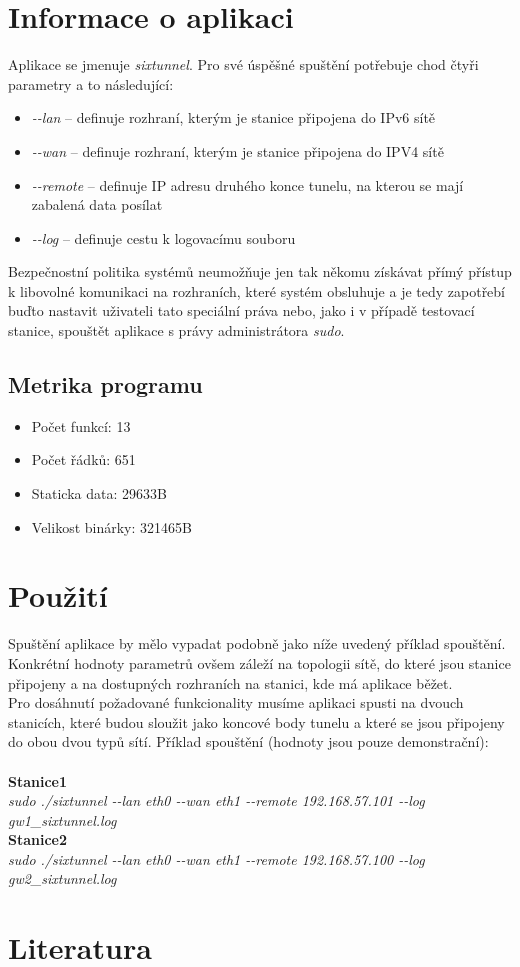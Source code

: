 \documentclass[12pt,a4paper,onecolumn]{article}
\begin{document}
\section{Informace o aplikaci}
Aplikace se jmenuje {\it sixtunnel}. Pro své úspěšné spuštění potřebuje chod čtyři parametry a
to následující:
\begin{itemize}
    \item {\it \--\--lan} -- definuje rozhraní, kterým je stanice připojena do IPv6 sítě
    \item {\it \--\--wan} -- definuje rozhraní, kterým je stanice připojena do IPV4 sítě
    \item {\it \--\--remote} -- definuje IP adresu druhého konce tunelu, na kterou se mají
        zabalená data posílat
    \item {\it \--\--log} -- definuje cestu k logovacímu souboru
\end{itemize}
\indent Bezpečnostní politika systémů neumožňuje jen tak někomu získávat přímý přístup k libovolné
komunikaci na rozhraních, které systém obsluhuje a je tedy zapotřebí buďto nastavit uživateli tato
speciální práva nebo, jako i v případě testovací stanice, spouštět aplikace s právy administrátora
{\it sudo}.

\subsection{Metrika programu}
\begin{itemize}
    \item Počet funkcí: 13 
    \item Počet řádků: 651 
    \item Staticka data: 29633B
    \item Velikost binárky: 321465B
\end{itemize}

\section{Použití}
Spuštění aplikace by mělo vypadat podobně jako níže uvedený příklad spouštění. Konkrétní hodnoty
parametrů ovšem záleží na topologii sítě, do které jsou stanice připojeny a na dostupných
rozhraních na stanici, kde má aplikace běžet.\\
\indent Pro dosáhnutí požadované funkcionality musíme aplikaci spusti na dvouch stanicích,
které budou sloužit jako koncové body tunelu a které se jsou připojeny do obou dvou typů
sítí. Příklad spouštění (hodnoty jsou pouze demonstrační):\\ \\
\textbf{Stanice1} \\
{\it sudo ./sixtunnel \--\--lan eth0 \--\--wan eth1 \--\--remote 192.168.57.101 \--\--log gw1\_sixtunnel.log}\\
\textbf{Stanice2} \\
{\it sudo ./sixtunnel \--\--lan eth0 \--\--wan eth1 \--\--remote 192.168.57.100 \--\--log gw2\_sixtunnel.log}

\nocite{*}
\section{Literatura}
    
\end{document}
